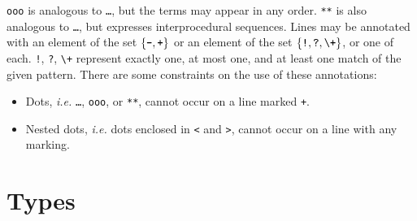 \documentclass{article}
\newcommand{\mita}[1]{\mbox{\it{{#1}}}}
\newcommand{\mtt}[1]{\mbox{\tt{{#1}}}}
\newcommand{\msf}[1]{\mbox{\sf{{#1}}}}
\newcommand{\ssf}[1]{\mbox{\scriptsize\sf{{#1}}}}
\newcommand{\mth}[1]{\({#1}\)}
\begin{document}

\noindent
{\tt ooo} is analogous to {\tt \ldots}, but the terms may appear in any
order.  {\tt ***} is also analogous to {\tt \ldots}, but expresses
interprocedural sequences.
Lines may be annotated with an element of the set $\{\mtt{-}, \mtt{+}\}$ or
an element of the set $\{\mtt{!}, \mtt{?}, \verb-\+-\}$, or one of each.
\mtt{!}, \mtt{?}, \verb-\+- represent exactly one, at most one, and at
least one match of the given pattern.  There are some constraints on the
use of these annotations:
\begin{itemize}
\item Dots, {\em i.e.} {\tt \ldots}, {\tt ooo}, or {\tt ***}, cannot occur
  on a line marked {\tt +}.
\item Nested dots, {\em i.e.} dots enclosed in {\tt <} and {\tt >}, cannot
  occur on a line with any marking.
\end{itemize}


\section{Types}

\begin{grammar}





  \CASE{}
\end{grammar}

\end{document}

